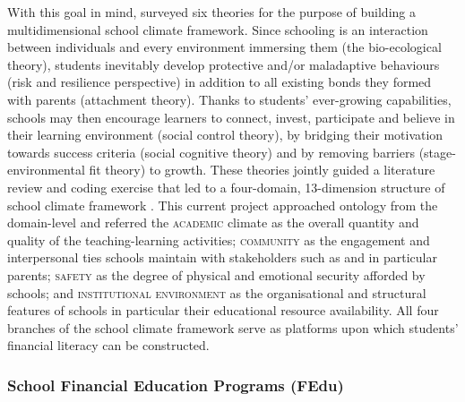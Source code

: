 With this goal in mind, \citet{wang:2016} surveyed six theories for the purpose of building a multidimensional school climate framework. Since schooling is an interaction between individuals and every environment immersing them (the bio-ecological theory), students inevitably develop protective and/or maladaptive behaviours (risk and resilience perspective) in addition to all existing bonds they formed with parents (attachment theory). Thanks to students' ever-growing capabilities, schools may then encourage learners to connect, invest, participate and believe in their learning environment (social control theory), by bridging their motivation towards success criteria (social cognitive theory) and by removing barriers (stage-
environmental fit theory) to growth. These theories jointly guided a literature review and coding exercise that led to a four-domain, 13-dimension structure of school climate framework \citep[see Figure 1,][p. 318]{wang:2016}. This current project approached  ontology from the domain-level and referred the \textsc{academic} climate as the overall quantity and quality of the teaching-learning activities; \textsc{community} as the engagement and interpersonal ties schools maintain with stakeholders such as and in particular parents; \textsc{safety} as the degree of physical and emotional security afforded by schools; and \textsc{institutional environment} as the organisational and structural features of schools in particular their educational resource availability. All four branches of the school climate framework serve as platforms upon which students' financial literacy can be constructed.

\subsubsection{School Financial Education Programs (FEdu)}


